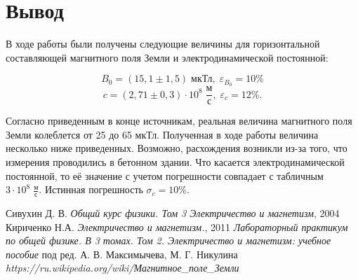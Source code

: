 \documentclass[a4paper,12pt]{article} %
\begin{document}
\newpage

\section*{Вывод}

В ходе работы были получены следующие величины для горизонтальной составляющей магнитного поля Земли и электродинамической постоянной:

$$B_0=\left(15,1\pm1,5\right) \; \text{мкТл}, \; \varepsilon_{B_0}=10\%$$
$$c=(2,71\pm0,3)\cdot 10^8 \; \frac{\text{м}}{\text{с}}, \; \varepsilon_c=12\%.$$

Согласно приведенным в конце источникам, реальная величина магнитного поля Земли колеблется от 25 до 65 мкТл.
Полученная в ходе работы величина несколько ниже приведенных. Возможно, расхождения возникли из-за того, что измерения проводились в бетонном здании. Что касается электродинамической постоянной, то её значение с учетом погрешности совпадает с табличным $3\cdot10^8\;\frac{\text{м}}{\text{с}}$. Истинная погрешность $\sigma_c=10\%$.


\begin{thebibliography}{4}
	 Сивухин Д. В. \emph{Общий курс физики. Том 3 Электричество и магнетизм}, 2004
	 Кириченко Н.А. \emph{Электричество и магнетизм.}, 2011
	 \emph{Лабораторный практикум по общей физике. В 3 томах. Том 2. Электричество и магнетизм: учебное пособие} под ред. А. В. Максимычева, М. Г. Никулина
	 \emph{https://ru.wikipedia.org/wiki/Магнитное\_поле\_Земли}
\end{thebibliography}
\end{document}
